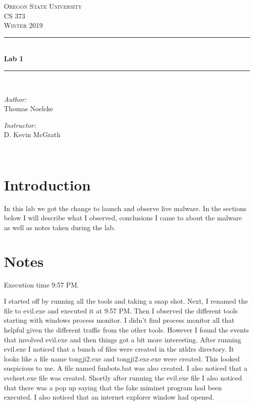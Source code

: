 \documentclass[letterpaper, onecolumn,10pt]{IEEEtran}
\begin{document}
    \begin{titlepage}
    \newcommand{\HRule}{\rule{\linewidth}{0.5mm}}
    \center
    \textsc{\Large Oregon State University}\\[1.5cm]
    \textsc{\Large CS 373}\\[0.5cm]
    \textsc{\Large Winter 2019}\\[0.5cm]
    \HRule \\[0.4cm]
    { \huge \bfseries Lab 1}\\[0.4cm] %
    \HRule \\[1.5cm]
    \begin{minipage}{0.4\textwidth}
        \begin{flushleft} \large
        \emph{Author:}\\
        Thomas Noelcke
        \end{flushleft}
    \end{minipage}
    \begin{minipage}{0.4\textwidth}
        \begin{flushright} \large
        \emph{Instructor:} \\
        D. Kevin McGrath\\
        \end{flushright}
    \end{minipage}\\[2cm]
		\end{titlepage}
		
		
		\section{Introduction} In this lab we got the change to launch and observe live malware. In the sections below I will describe what I observed, conclusions I came to about the malware as well as notes taken during the lab.
	
		\section{Notes}
			Execution time 9:57 PM.
		
		    I started off by running all the tools and taking a snap shot. Next, I renamed the file to evil.exe and executed it at 9:57 PM. Then I observed the different tools starting with windows process monitor. I didn't find process monitor all that helpful given the different traffic from the other tools. However I found the events that involved evil.exe and then things got a bit more interesting. After running evil.exe I noticed that a bunch of files were created in the ntldrs directory. It looks like a file name tongji2.exe and tongji2.exe.exe were created. This looked suspicious to me. A file named funbots.bat was also created. I also noticed that a svchest.exe file was created. Shortly after running the evil.exe file I also noticed that there was a pop up saying that the fake miminet program had been executed. I also noticed that an internet explorer window had opened.\\
		    
\end{document}
